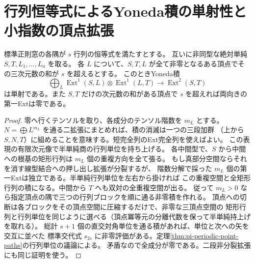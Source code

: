 \section{行列恒等式によるYoneda積の単射性と小指数の頂点拡張}
\label{sec:pi-yoneda-bridges}
\begin{lemma}\label{lem:pi-yoneda-bridges}
標準正則窓の各隅が $s$ 行列の恒等式を満たすとする。
互いに非同型な絶対単純 $S,T,L_1,\ldots,L_n$ を取る。
各 $L$ について、$S,T,L$ が全て非零となるある頂点でその三次元数の和が $s$ を超えるとする。
このときYoneda積
\[
 \bigoplus_L\operatorname{Ext}^1(S,L)\otimes\operatorname{Ext}^1(L,T)
                   \longrightarrow\operatorname{Ext}^2(S,T)
\]
は単射である。また $S,T$ だけの次元数の和がある頂点で $s$ を超えれば両向きの第一Extは零である。
\end{lemma}
\begin{proof}
零へ行くテンソルを取り、各成分のテンソル階数を $m_L$ とする。
$N=\bigoplus L^{m_L}$ を通る二拡張にまとめれば、積の消滅は一つの三段加群
（上から $S,N,T$）に組めることを意味する。短完全列のExt完全列を使えばよい。
この表現の有限次元像で半単純商の行列単位を持ち上げる。
各中間型で、$S$ から中間への根基の矩形行列は $m_L$ 個の重複方向を全て張る。
もし真部分空間ならそれを消す線型結合への押し出し拡張が分裂するが、
階数分解で採った $m_L$ 個の第一Extは独立である。半単純行列単位を左右から掛ければ
この重複空間と全矩形行列の積になる。中間から $T$ へも双対の全重複空間が出る。
従って $m_L>0$ なら指定頂点の隅で三つの行列ブロックを順に通る非零積を作れる。
頂点への切断は各ブロックをその頂点空間に圧縮するだけで、非零な三頂点空間の
矩形行列と行列単位を同じように選べる（頂点冪等元の分離代数を保って半単純持上げを取れる）。
総計 $s+1$ 個の直交対角単位を通る積があれば、単位と次への矢を交互に並べた
標準交代式 $s_{2s}$ に非零評価がある。定理\ref{thm:pi-periodic-point-paths}の行列単位の議論による。
矛盾なので全成分が零である。二段非分裂拡張にも同じ証明を使う。
\end{proof}

